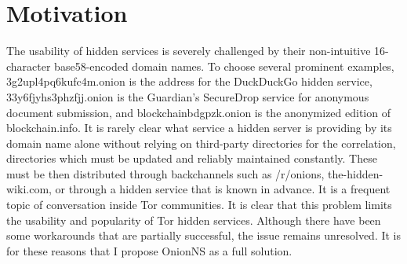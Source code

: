 \section{Motivation}
\label{sec:Motivation}

The usability of hidden services is severely challenged by their non-intuitive 16-character base58-encoded domain names. To choose several prominent examples, 3g2upl4pq6kufc4m.onion is the address for the DuckDuckGo hidden service, 33y6fjyhs3phzfjj.onion is the Guardian's SecureDrop service for anonymous document submission, and blockchainbdgpzk.onion is the anonymized edition of blockchain.info. It is rarely clear what service a hidden server is providing by its domain name alone without relying on third-party directories for the correlation, directories which must be updated and reliably maintained constantly. These must be then distributed through backchannels such as /r/onions, the-hidden-wiki.com, or through a hidden service that is known in advance. It is a frequent topic of conversation inside Tor communities. It is clear that this problem limits the usability and popularity of Tor hidden services. Although there have been some workarounds that are partially successful, the issue remains unresolved. It is for these reasons that I propose OnionNS as a full solution.
